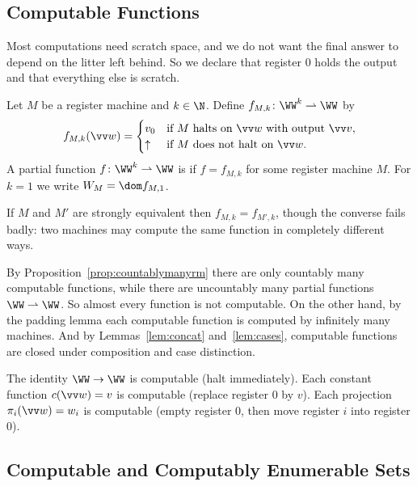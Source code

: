 \subsection{Computable Functions}

Most computations need scratch space, and we do not want the final answer to depend on the litter left behind. So we declare that register $0$ holds the output and that everything else is scratch.

\begin{definition}
	Let $M$ be a register machine and $k \in \N$. Define $f_{M,k} \colon \WW^k \rightharpoonup \WW$ by
	$$f_{M,k}(\vv w) = \begin{cases} v_0 & \text{if } M \text{ halts on } \vv w \text{ with output } \vv v, \\ \uparrow & \text{if } M \text{ does not halt on } \vv w.\end{cases}$$
	A partial function $f \colon \WW^k \rightharpoonup \WW$ is  if $f = f_{M,k}$ for some register machine $M$. For $k = 1$ we write $W_M = \dom f_{M,1}$.
\end{definition}

If $M$ and $M'$ are strongly equivalent then $f_{M,k} = f_{M',k}$, though the converse fails badly: two machines may compute the same function in completely different ways.

\begin{remark}\label{rem:countablycomputable}
	By Proposition~\ref{prop:countablymanyrm} there are only countably many computable functions, while there are uncountably many partial functions $\WW \rightharpoonup \WW$. So almost every function is not computable. On the other hand, by the padding lemma each computable function is computed by infinitely many machines. And by Lemmas~\ref{lem:concat} and~\ref{lem:cases}, computable functions are closed under composition and case distinction.
\end{remark}

\begin{example}
	The identity $\WW \to \WW$ is computable (halt immediately). Each constant function $c(\vv w) = v$ is computable (replace register $0$ by $v$). Each projection $\pi_i(\vv w) = w_i$ is computable (empty register $0$, then move register $i$ into register $0$).
\end{example}

\subsection{Computable and Computably Enumerable Sets}

